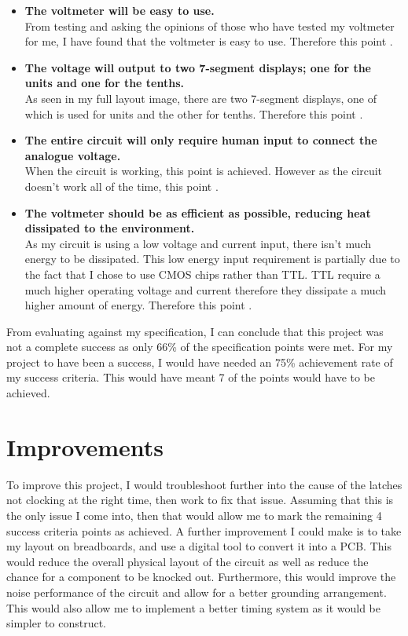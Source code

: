 \begin{itemize}
    \item \textbf{The voltmeter will be easy to use.}\\ From testing and asking the opinions of those who have tested my voltmeter for me, I have found that the voltmeter is easy to use. Therefore this point .
    \item \textbf{The voltage will output to two 7-segment displays; one for the units and one for the tenths.} \\ As seen in my full layout image, there are two 7-segment displays, one of which is used for units and the other for tenths. Therefore this point .
    \item \textbf{The entire circuit will only require human input to connect the analogue voltage.}\\ When the circuit is working, this point is achieved. However as the circuit doesn't work all of the time, this point .
    \item \textbf{The voltmeter should be as efficient as possible, reducing heat dissipated to the environment.}\\ As my circuit is using a low voltage and current input, there isn't much energy to be dissipated. This low energy input requirement is partially due to the fact that I chose to use CMOS chips rather than TTL. TTL require a much higher operating voltage and current therefore they dissipate a much higher amount of energy. Therefore this point .
\end{itemize}
From evaluating against my specification, I can conclude that this project was not a complete success as only 66\% of the specification points were met. \newline For my project to have been a success, I would have needed an 75\% achievement rate of my success criteria. This would have meant 7 of the points would have to be achieved.

\section{Improvements}
To improve this project, I would troubleshoot further into the cause of the latches not clocking at the right time, then work to fix that issue. Assuming that this is the only issue I come into, then that would allow me to mark the remaining 4 success criteria points as achieved.\newline
A further improvement I could make is to take my layout on breadboards, and use a digital tool to convert it into a PCB. This would reduce the overall physical layout of the circuit as well as reduce the chance for a component to be knocked out. Furthermore, this would improve the noise performance of the circuit and allow for a better grounding arrangement. This would also allow me to implement a better timing system as it would be simpler to construct.


